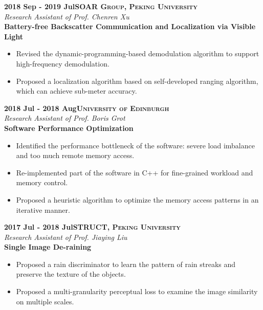 \documentclass[a4paper,10pt,final]{memoir}
\newcommand{\myThemeColor}{Maroon}
\newcommand{\SmallSep}{\vspace{0.9em}}
\newcommand{\CVItem}[1]
	{\textbf{\color{\myThemeColor} #1}}
\begin{document}
\CVItem{2018 Sep - 2019 Jul\hfill\textsc{SOAR Group, Peking University}}\\
\textit{Research Assistant of Prof. Chenren Xu}\\
\textbf{Battery-free Backscatter Communication and Localization via Visible Light}
\begin{itemize}
	\vspace{-0.5em}
	\setlength{\itemsep}{0pt}
	\setlength{\parsep}{0pt}
	\setlength{\parskip}{0pt}
	\item Revised the dynamic-programming-based demodulation algorithm to support high-frequency demodulation.
	\item Proposed a localization algorithm based on self-developed ranging algorithm, which can achieve sub-meter accuracy.
\end{itemize}

\CVItem{2018 Jul - 2018 Aug\hfill\textsc{University of Edinburgh}}\\
\textit{Research Assistant of Prof. Boris Grot}\\
\textbf{Software Performance Optimization}
\begin{itemize}
	\vspace{-0.5em}
	\setlength{\itemsep}{0pt}
	\setlength{\parsep}{0pt}
	\setlength{\parskip}{0pt}
	\item Identified the performance bottleneck of the software: severe load imbalance and too much remote memory access.
	\item Re-implemented part of the software in C++ for fine-grained workload and memory control.
	\item Proposed a heuristic algorithm to optimize the memory access patterns in an iterative manner.
\end{itemize}


\SmallSep
\CVItem{2017 Jul - 2018 Jul\hfill\textsc{STRUCT, Peking University}}\\
\textit{Research Assistant of Prof. Jiaying Liu}\\
\textbf{Single Image De-raining}
\begin{itemize}
	\vspace{-0.5em}
	\setlength{\itemsep}{0pt}
	\setlength{\parsep}{0pt}
	\setlength{\parskip}{0pt}
	\item Proposed a rain discriminator to learn the pattern of rain streaks and preserve the texture of the objects.
	\item Proposed a multi-granularity perceptual loss to examine the image similarity on multiple scales.
\end{itemize}
\end{document}
